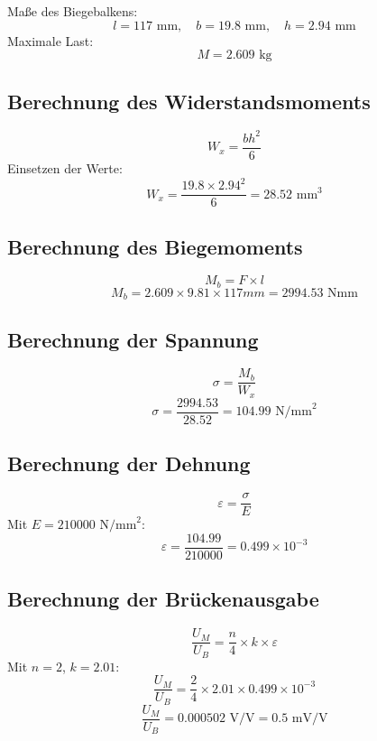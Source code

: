 

Maße des Biegebalkens:
\[
l = 117 \text{ mm}, \quad b = 19.8 \text{ mm}, \quad h = 2.94 \text{ mm}
\]
Maximale Last:
\[
M = 2.609 \text{ kg}
\]

\subsection*{Berechnung des Widerstandsmoments}
\[
W_x = \frac{b h^2}{6}
\]
Einsetzen der Werte:
\[
W_x = \frac{19.8 \times 2.94^2}{6} = 28.52 \text{ mm}^3
\]

\subsection*{Berechnung des Biegemoments}
\[
M_b = F \times l
\]
\[
M_b = 2.609 \times 9.81 \times 117mm = 2994.53 \text{ Nmm}
\]

\subsection*{Berechnung der Spannung}
\[
\sigma = \frac{M_b}{W_x}
\]
\[
\sigma = \frac{2994.53}{28.52} = 104.99 \text{ N/mm}^2
\]

\subsection*{Berechnung der Dehnung}
\[
\varepsilon = \frac{\sigma}{E}
\]
Mit \(E = 210000 \text{ N/mm}^2\):
\[
\varepsilon = \frac{104.99}{210000} = 0.499\times 10^{-3}
\]

\subsection*{Berechnung der Brückenausgabe}
\[
\frac{U_M}{U_B} = \frac{n}{4} \times k \times \varepsilon
\]
Mit \( n = 2 \), \( k = 2.01 \):
\[
\frac{U_M}{U_B} = \frac{2}{4} \times 2.01 \times 0.499 \times 10^{-3}
\]
\[
\frac{U_M}{U_B} = 0.000502 \text{ V/V} = 0.5 \text{ mV/V}
\]